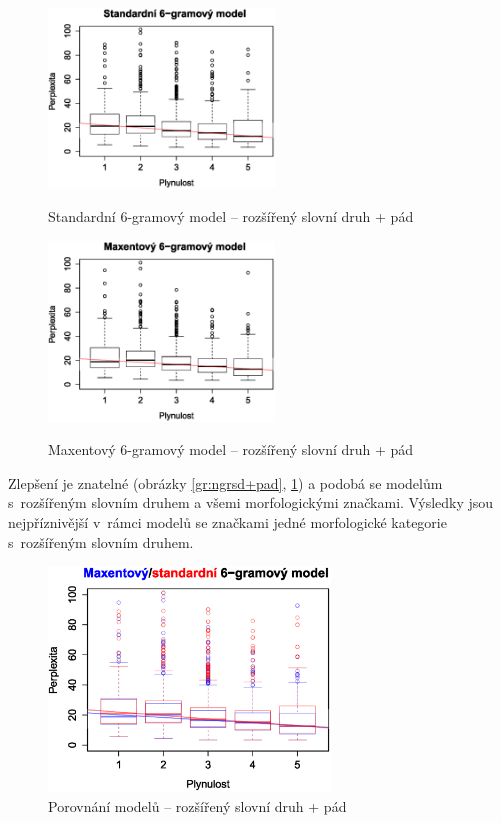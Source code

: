 \documentclass[12pt,a4paper]{report}
\begin{document}
\begin{figure}[!htb]
\begin{center}
  \centering\includegraphics[width=60mm]{./grafy/morf/ngram/rsd+pad.svg.eps}
  \caption{Standardní 6-gramový model -- rozšířený slovní druh + pád}\label{gr:ngrsd+pad}
\endminipage\quad
{}
  \centering\includegraphics[width=60mm]{./grafy/morf/maxent/rsd+pad.svg.eps}
  \caption{Maxentový 6-gramový model -- rozšířený slovní druh + pád}\label{gr:maxrsd+pad}
\endminipage
\end{center}
\end{figure}

Zlepšení je znatelné (obrázky \ref{gr:ngrsd+pad}, \ref{gr:maxrsd+pad}) a podobá se modelům s~rozšířeným slovním druhem a všemi morfologickými značkami. Výsledky jsou nejpříznivější v~rámci modelů se značkami jedné morfologické kategorie s~rozšířeným slovním druhem.

\begin{figure}[!htbp]
\begin{center}
	\centering
	\includegraphics[width=75mm]{./grafy/morf/porovnani/rsd+pad.eps}	
	\caption{Porovnání modelů -- rozšířený slovní druh + pád}\label{gr:porrsd+pad}
\endminipage
\end{center}
\end{figure}
\end{document}
